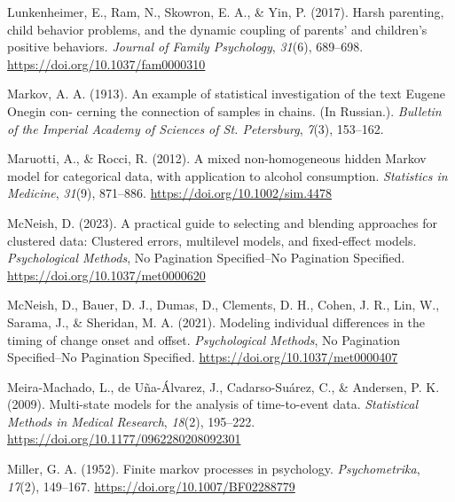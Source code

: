 \documentclass[12pt]{./styles/outhesis}
\begin{document}
\leavevmode{}%
Lunkenheimer, E., Ram, N., Skowron, E. A., \& Yin, P. (2017). Harsh
parenting, child behavior problems, and the dynamic coupling of parents'
and children's positive behaviors. \emph{Journal of Family Psychology},
\emph{31}(6), 689--698. \url{https://doi.org/10.1037/fam0000310}

\leavevmode{}%
Markov, A. A. (1913). An example of statistical investigation of the
text {Eugene Onegin} con- cerning the connection of samples in chains.
({In Russian}.). \emph{Bulletin of the Imperial Academy of Sciences of
St. Petersburg}, \emph{7}(3), 153--162.

\leavevmode{}%
Maruotti, A., \& Rocci, R. (2012). A mixed non-homogeneous hidden
{Markov} model for categorical data, with application to alcohol
consumption. \emph{Statistics in Medicine}, \emph{31}(9), 871--886.
\url{https://doi.org/10.1002/sim.4478}

\leavevmode{}%
McNeish, D. (2023). A practical guide to selecting and blending
approaches for clustered data: {Clustered} errors, multilevel models,
and fixed-effect models. \emph{Psychological Methods}, No Pagination
Specified--No Pagination Specified.
\url{https://doi.org/10.1037/met0000620}

\leavevmode{}%
McNeish, D., Bauer, D. J., Dumas, D., Clements, D. H., Cohen, J. R.,
Lin, W., Sarama, J., \& Sheridan, M. A. (2021). Modeling individual
differences in the timing of change onset and offset.
\emph{Psychological Methods}, No Pagination Specified--No Pagination
Specified. \url{https://doi.org/10.1037/met0000407}

\leavevmode{}%
Meira-Machado, L., de Uña-Álvarez, J., Cadarso-Suárez, C., \& Andersen,
P. K. (2009). Multi-state models for the analysis of time-to-event data.
\emph{Statistical Methods in Medical Research}, \emph{18}(2), 195--222.
\url{https://doi.org/10.1177/0962280208092301}

\leavevmode{}%
Miller, G. A. (1952). Finite markov processes in psychology.
\emph{Psychometrika}, \emph{17}(2), 149--167.
\url{https://doi.org/10.1007/BF02288779}
\end{document}
